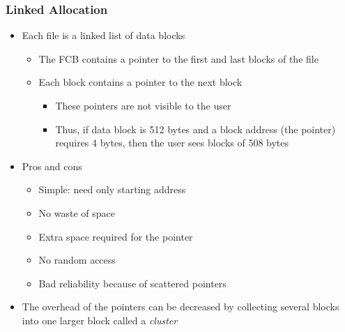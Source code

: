 \documentclass[CJKutf8,xcolor=pdftex,dvipsnames,table]{beamer}
\begin{document}
\begin{CJK*}{UTF8}{song}
  \begin{frame}
    \frametitle{Linked Allocation} \pause
    \begin{itemize}\parskip=0pt
    \item Each file is a linked list of data blocks \pause
      \begin{itemize}\parskip=0pt
      \item The FCB contains a pointer to the first and last blocks of the file \pause
      \item Each block contains a pointer to the next block \pause
        \begin{itemize}\parskip=0pt
        \item These pointers are not visible to the user \pause
        \item Thus, if data block is 512 bytes and a block address (the pointer) requires 4 bytes, then the user sees blocks of 508 bytes \pause
        \end{itemize}
      \end{itemize}
    \item Pros and cons \pause
      \begin{itemize}\parskip=0pt
      \item Simple: need only starting address \pause
      \item No waste of space \pause
      \item Extra space required for the pointer \pause
      \item No random access \pause
      \item Bad reliability because of scattered pointers \pause
      \end{itemize}
    \item The overhead of the pointers can be decreased by collecting several blocks into one larger block called a \emph{cluster}
    \end{itemize}
  \end{frame}
  

\end{CJK*}
\end{document}
